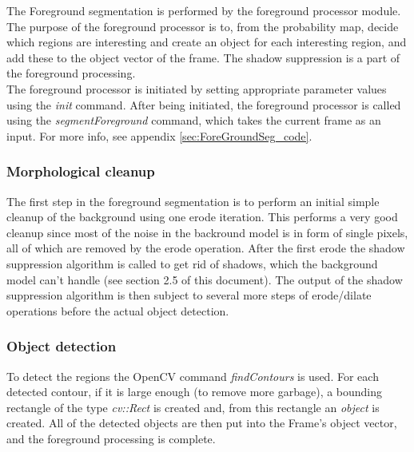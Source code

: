 The Foreground segmentation is performed by the foreground processor module. The purpose of the foreground processor is to, from the probability map, decide which regions are interesting and create an object for each interesting region, and add these to the object vector of the frame. The shadow suppression is a part of the foreground processing. \\
\newline
The foreground processor is initiated by setting appropriate parameter values using the \emph{init} command. After being initiated, the foreground processor is called using the \emph{segmentForeground} command, which takes the current frame as an input. For more info, see appendix \ref{sec:ForeGroundSeg_code}.

\subsubsection{Morphological cleanup}
The first step in the foreground segmentation is to perform an initial simple cleanup of the background using one erode iteration. This performs a very good cleanup since most of the noise in the backround model is in form of single pixels, all of which are removed by the erode operation. After the first erode the shadow suppression algorithm is called to get rid of shadows, which the background model can't handle (see section 2.5 of this document). The output of the shadow suppression algorithm is then subject to several more steps of erode/dilate operations before the actual object detection.


\subsubsection{Object detection}
To detect the regions the OpenCV command \emph{findContours} is used. For each detected contour, if it is large enough (to remove more garbage), a bounding rectangle of the type \emph{cv::Rect} is created and, from this rectangle an \emph{object} is created. All of the detected objects are then put into the Frame's object vector, and the foreground processing is complete.